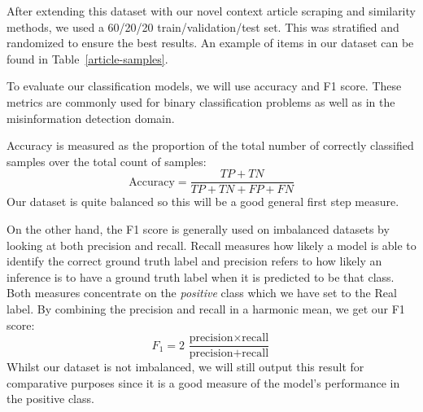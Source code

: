 \documentclass{article}
\begin{document}
After extending this dataset with our novel context article scraping and similarity methods, we used a 60/20/20 train/validation/test set. This was stratified and randomized to ensure the best results. An example of items in our dataset can be found in Table~\ref{article-samples}.

\begin{table}
  \begin{center}
  \end{center}
  \caption{A sample of one fake and real article in our dataset. The article ID, title and content are shown in the rows. Both articles are regarding a scandal with Hillary Clinton using a private server to store emails. The fake article reports on an event that never happens whereas the real article reports the true event -- that Clinton was exonerated from criminality.}
  \label{article-samples}
\end{table}


To evaluate our classification models, we will use accuracy and F1 score. These metrics are commonly used for binary classification problems as well as in the misinformation detection domain.

Accuracy is measured as the proportion of the total number of correctly classified samples over the total count of samples:
$$\text{Accuracy} = \frac{TP + TN}{TP + TN + FP + FN}$$
Our dataset is quite balanced so this will be a good general first step measure.

On the other hand, the F1 score is generally used on imbalanced datasets by looking at both precision and recall. Recall measures how likely a model is able to identify the correct ground truth label and precision refers to how likely an inference is to have a ground truth label when it is predicted to be that class. Both measures concentrate on the \emph{positive} class which we have set to the Real label. By combining the precision and recall in a harmonic mean, we get our F1 score:
$$F_1 = 2\,\frac{\text{precision}\times\text{recall}}{\text{precision}+\text{recall}}$$
Whilst our dataset is not imbalanced, we will still output this result for comparative purposes since it is a good measure of the model's performance in the positive class.
\end{document}
